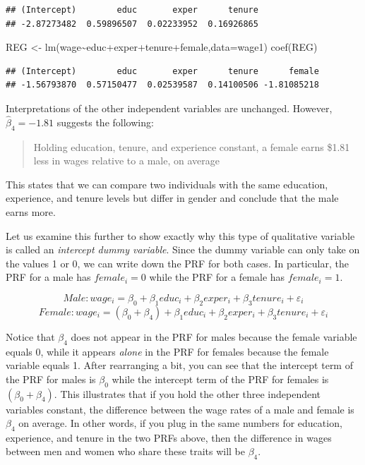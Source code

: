\documentclass[
]{book}
\newenvironment{Shaded}{\begin{snugshade}}{\end{snugshade}}
\newcommand{\AttributeTok}[1]{\textcolor[rgb]{0.77,0.63,0.00}{#1}}
\newcommand{\FunctionTok}[1]{\textcolor[rgb]{0.00,0.00,0.00}{#1}}
\newcommand{\NormalTok}[1]{#1}
\newcommand{\OtherTok}[1]{\textcolor[rgb]{0.56,0.35,0.01}{#1}}
\newcommand{\SpecialCharTok}[1]{\textcolor[rgb]{0.00,0.00,0.00}{#1}}
\begin{document}
\begin{verbatim}
## (Intercept)        educ       exper      tenure 
## -2.87273482  0.59896507  0.02233952  0.16926865
\end{verbatim}

\begin{Shaded}
\begin{Highlighting}[]
\NormalTok{REG }\OtherTok{\textless{}{-}} \FunctionTok{lm}\NormalTok{(wage}\SpecialCharTok{\textasciitilde{}}\NormalTok{educ}\SpecialCharTok{+}\NormalTok{exper}\SpecialCharTok{+}\NormalTok{tenure}\SpecialCharTok{+}\NormalTok{female,}\AttributeTok{data=}\NormalTok{wage1)}
\FunctionTok{coef}\NormalTok{(REG)}
\end{Highlighting}
\end{Shaded}

\begin{verbatim}
## (Intercept)        educ       exper      tenure      female 
## -1.56793870  0.57150477  0.02539587  0.14100506 -1.81085218
\end{verbatim}

Interpretations of the other independent variables are unchanged. However, \(\hat{\beta}_4 = -1.81\) suggests the following:

\begin{quote}
Holding education, tenure, and experience constant, a female earns \$1.81 less in wages relative to a male, on average
\end{quote}

This states that we can compare two individuals with the same education, experience, and tenure levels but differ in gender and conclude that the male earns more.

Let us examine this further to show exactly why this type of qualitative variable is called an \emph{intercept dummy variable}. Since the dummy variable can only take on the values 1 or 0, we can write down the PRF for both cases. In particular, the PRF for a male has \(female_i = 0\) while the PRF for a female has \(female_i = 1\).

\[Male: wage_i=\beta_0+\beta_1educ_i+\beta_2exper_i+\beta_3tenure_i+\varepsilon_i\]
\[Female: wage_i=(\beta_0+\beta_4)+\beta_1educ_i+\beta_2exper_i+\beta_3tenure_i+\varepsilon_i\]

Notice that \(\beta_4\) does not appear in the PRF for males because the female variable equals 0, while it appears \emph{alone} in the PRF for females because the female variable equals 1. After rearranging a bit, you can see that the intercept term of the PRF for males is \(\beta_0\) while the intercept term of the PRF for females is \((\beta_0+\beta_4)\). This illustrates that if you hold the other three independent variables constant, the difference between the wage rates of a male and female is \(\beta_4\) on average. In other words, if you plug in the same numbers for education, experience, and tenure in the two PRFs above, then the difference in wages between men and women who share these traits will be \(\beta_4\).
\end{document}
